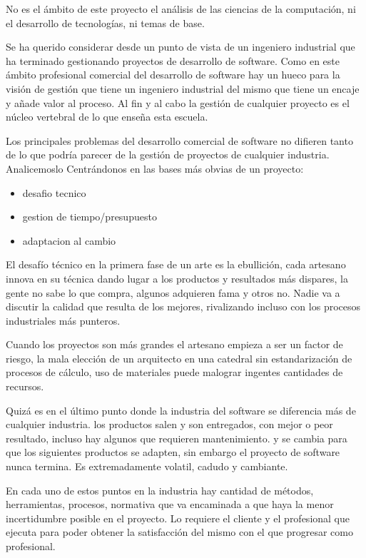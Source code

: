 
 No es el ámbito de este proyecto el análisis de las ciencias de la computación, ni el desarrollo de tecnologías, ni temas de base. 
 
 Se ha querido considerar desde un punto de vista de un ingeniero industrial que ha terminado gestionando proyectos de desarrollo de software. Como en este ámbito profesional comercial del desarrollo de software hay un hueco para la visión de gestión que tiene un ingeniero industrial del mismo que tiene un encaje y añade valor al proceso. Al fin y al cabo la gestión de cualquier proyecto es el núcleo vertebral de lo que enseña esta escuela.
 
 
Los principales problemas del desarrollo comercial de software no difieren tanto de lo que podría parecer de la gestión de proyectos de cualquier industria. Analicemoslo Centrándonos en las bases más obvias de un proyecto: 

\begin{itemize}
 	\item desafio tecnico
	\item gestion de tiempo/presupuesto
	\item adaptacion al cambio
\end{itemize} 


El desafío técnico en la primera fase de un arte es la ebullición, cada artesano innova en su técnica dando lugar a los productos y resultados más dispares, la gente no sabe lo que compra, algunos adquieren fama y otros no. Nadie va a discutir la calidad que resulta de los mejores, rivalizando incluso con los procesos industriales más punteros.

Cuando los proyectos son más grandes el artesano empieza a ser un factor de riesgo, la mala elección de un arquitecto en una catedral sin estandarización de procesos de cálculo, uso de materiales puede malograr ingentes cantidades de recursos.

Quizá es en el último punto donde la industria del software se diferencia más de cualquier industria. los productos salen y son entregados, con mejor o peor resultado, incluso hay algunos que requieren mantenimiento. y se cambia para que los siguientes productos se adapten, sin embargo el proyecto de software nunca termina. Es extremadamente volatil, cadudo y cambiante.

En cada uno de estos puntos en la industria hay cantidad de métodos, herramientas, procesos, normativa que va encaminada a que haya la menor incertidumbre posible en el proyecto. Lo requiere el cliente y el profesional que ejecuta para poder obtener la satisfacción del mismo con el que progresar como profesional.

